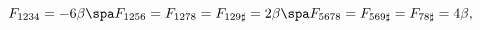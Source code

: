 \begin{equation}
\label{fluxn5}
F_{1234} = - 6\beta \spa
F_{1256} = F_{1278} = F_{129\sharp} = 2\beta \spa
F_{5678} = F_{569\sharp} = F_{78\sharp} = 4\beta,
\end{equation}

